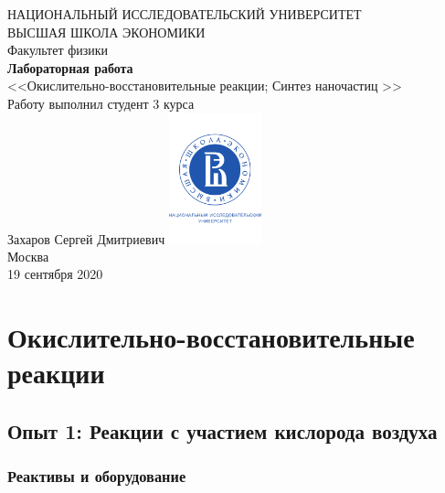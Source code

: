 \documentclass[a4paper, 12pt]{article}
\begin{document}
	\begin{titlepage}
		\begin{center}
			$$$$
			$$$$
			$$$$
			$$$$
			{\Large{НАЦИОНАЛЬНЫЙ ИССЛЕДОВАТЕЛЬСКИЙ УНИВЕРСИТЕТ}}\\
			\vspace{0.1cm}
			{\Large{ВЫСШАЯ ШКОЛА ЭКОНОМИКИ}}\\
			\vspace{0.25cm}
			{\large{Факультет физики}}\\
			\vspace{5.5cm}
			{\Huge\textbf{{Лабораторная работа}}}\\%
			\vspace{1cm}
			{\LARGE{<<Окислительно-восстановительные реакции; Синтез наночастиц >>}}\\%
			\vspace{2cm}
			{Работу выполнил студент 3 курса}\\
			{Захаров Сергей Дмитриевич}
			\vfill
			\includegraphics[width = 0.2\textwidth]{HSElogo}\\
			\vfill
			Москва\\
			19 сентября 2020
		\end{center}
	\end{titlepage}

\tableofcontents

\newpage


\section{Окислительно-восстановительные реакции}

\subsection{Опыт 1: Реакции с участием кислорода воздуха}

\subsubsection{Реактивы и оборудование}
\end{document}
